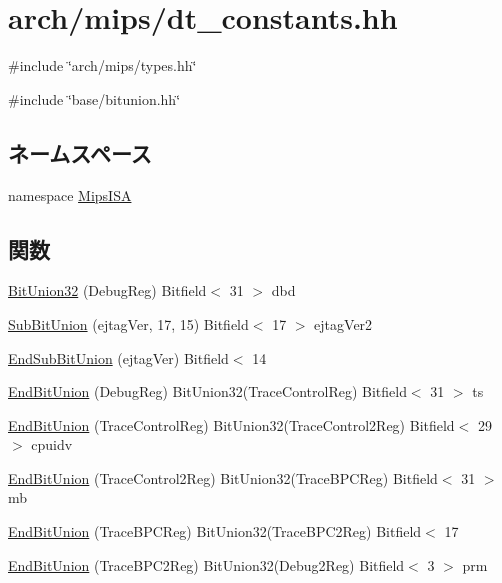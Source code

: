 \hypertarget{mips_2dt__constants_8hh}{
\section{arch/mips/dt\_\-constants.hh}
\label{mips_2dt__constants_8hh}
}
{\ttfamily \#include \char`\"{}arch/mips/types.hh\char`\"{}}\par
{\ttfamily \#include \char`\"{}base/bitunion.hh\char`\"{}}\par
\subsection*{ネームスペース}
\begin{DoxyCompactItemize}
\item 
namespace \hyperlink{namespaceMipsISA}{MipsISA}
\end{DoxyCompactItemize}
\subsection*{関数}
\begin{DoxyCompactItemize}
\item 
\hyperlink{namespaceMipsISA_ab29959b11b97e2f28ab81dda7a828367}{BitUnion32} (DebugReg) Bitfield$<$ 31 $>$ dbd
\item 
\hyperlink{namespaceMipsISA_aada8c158cc81aa418c360bde1d4b9a59}{SubBitUnion} (ejtagVer, 17, 15) Bitfield$<$ 17 $>$ ejtagVer2
\item 
\hyperlink{namespaceMipsISA_ad1223c93dc1c573511a672beb68ed125}{EndSubBitUnion} (ejtagVer) Bitfield$<$ 14
\item 
\hyperlink{namespaceMipsISA_a74e5941d61677e3e49c387d644b057cb}{EndBitUnion} (DebugReg) BitUnion32(TraceControlReg) Bitfield$<$ 31 $>$ ts
\item 
\hyperlink{namespaceMipsISA_a8edb562d62f5bc109749bb5e5c51d9f1}{EndBitUnion} (TraceControlReg) BitUnion32(TraceControl2Reg) Bitfield$<$ 29 $>$ cpuidv
\item 
\hyperlink{namespaceMipsISA_af61b5ac7de0418d4ad6c186a7ca29d0c}{EndBitUnion} (TraceControl2Reg) BitUnion32(TraceBPCReg) Bitfield$<$ 31 $>$ mb
\item 
\hyperlink{namespaceMipsISA_a7a312f5d7bfedd7aeba964423eafec3d}{EndBitUnion} (TraceBPCReg) BitUnion32(TraceBPC2Reg) Bitfield$<$ 17
\item 
\hyperlink{namespaceMipsISA_a57be9529ca2847db116487077b34308f}{EndBitUnion} (TraceBPC2Reg) BitUnion32(Debug2Reg) Bitfield$<$ 3 $>$ prm
\end{DoxyCompactItemize}
